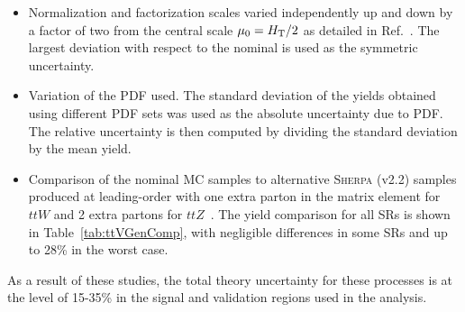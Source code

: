 \begin{itemize}
\item Normalization and factorization scales varied independently up and down by a factor of two from the central scale $\mu_0 = H_{\rm T}/2$ as detailed in Ref.~\cite{ATL-PHYS-PUB-2016-005}. 
The largest deviation with respect to the nominal is used as the symmetric uncertainty.
\item Variation of the PDF used.
The standard deviation of the yields obtained using different PDF sets was used as the absolute uncertainty due to PDF. 
The relative uncertainty is then computed by dividing the standard deviation by the mean yield.
\item Comparison of the nominal \AMCATNLO MC samples to alternative \textsc{Sherpa} (v2.2) samples produced at leading-order with one extra parton in the matrix element for $ttW$ and 2 extra partons 
for $ttZ$~\cite{ATL-PHYS-PUB-2016-005}. 
The yield comparison for all SRs is shown in Table~\ref{tab:ttVGenComp}, with negligible differences in some SRs and up to 28\% in the worst case.
\end{itemize}
As a result of these studies, the total theory uncertainty for these processes 
is at the level of 15-35\% in the signal and validation regions used in the 
analysis. 
